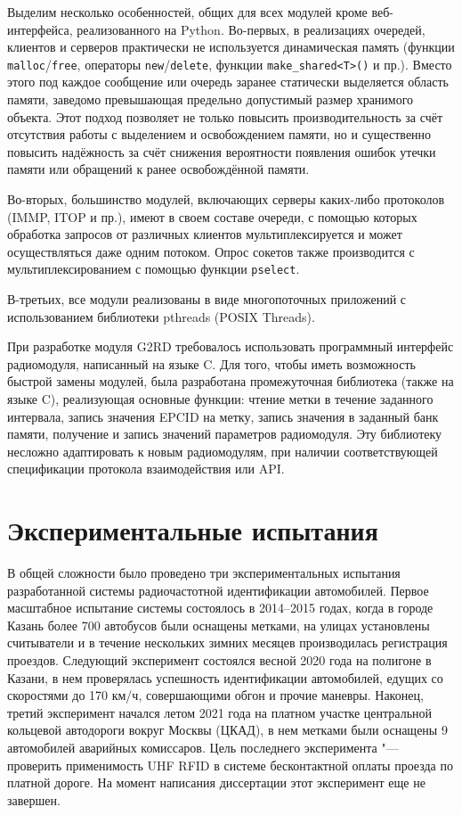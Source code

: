 Выделим несколько особенностей, общих для всех модулей кроме веб-интерфейса, реализованного на Python. Во-первых, в реализациях очередей, клиентов и серверов практически не используется динамическая память (функции \texttt{malloc}/\texttt{free}, операторы \texttt{new}/\texttt{delete}, функции \texttt{make\_shared<T>()} и пр.). Вместо этого под каждое сообщение или очередь заранее статически выделяется область памяти, заведомо превышающая предельно допустимый размер хранимого объекта. Этот подход позволяет не только повысить производительность за счёт отсутствия работы с выделением и освобождением памяти, но и существенно повысить надёжность за счёт снижения вероятности появления ошибок утечки памяти или обращений к ранее освобождённой памяти.

Во-вторых, большинство модулей, включающих серверы каких-либо протоколов (IMMP, ITOP и пр.), имеют в своем составе очереди, с помощью которых обработка запросов от различных клиентов мультиплексируется и может осуществляться даже одним потоком. Опрос сокетов также производится с мультиплексированием с помощью функции \texttt{pselect}.

В-третьих, все модули реализованы в виде многопоточных приложений с использованием библиотеки pthreads (POSIX Threads).

При разработке модуля G2RD требовалось использовать программный интерфейс радиомодуля, написанный на языке C. Для того, чтобы иметь возможность быстрой замены модулей, была разработана промежуточная библиотека (также на языке C), реализующая основные функции: чтение метки в течение заданного интервала, запись значения EPCID на метку, запись значения в заданный банк памяти, получение и запись значений параметров радиомодуля. Эту библиотеку несложно адаптировать к новым радиомодулям, при наличии соответствующей спецификации протокола взаимодействия или API.




\section{Экспериментальные испытания}\label{sec:ch5_experiments}

В общей сложности было проведено три экспериментальных испытания разработанной системы радиочастотной идентификации автомобилей. Первое масштабное испытание системы состоялось в 2014--2015 годах, когда в городе Казань более 700 автобусов были оснащены метками, на улицах установлены считыватели и в течение нескольких зимних месяцев производилась регистрация проездов. Следующий эксперимент состоялся весной 2020 года на полигоне в Казани, в нем проверялась успешность идентификации автомобилей, едущих со скоростями до 170 км/ч, совершающими обгон и прочие маневры. Наконец, третий эксперимент начался летом 2021 года на платном участке центральной кольцевой автодороги вокруг Москвы (ЦКАД), в нем метками были оснащены 9 автомобилей аварийных комиссаров. Цель последнего эксперимента "--- проверить применимость UHF RFID в системе бесконтактной оплаты проезда по платной дороге. На момент написания диссертации этот эксперимент еще не завершен.


